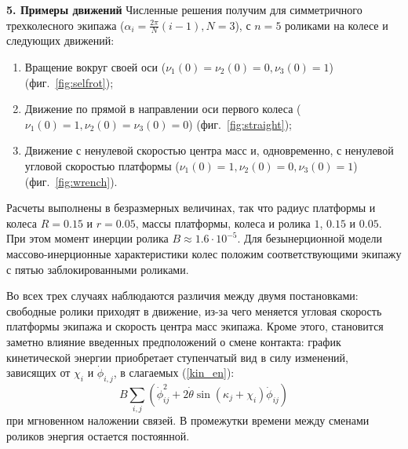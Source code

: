 
{\bf 5. Примеры движений}
Численные решения получим для симметричного трехколесного экипажа ($\alpha_i = \frac{2\pi}{N}(i - 1), N = 3$), с $n = 5$ роликами на колесе и следующих движений:
\begin{enumerate}[wide]
    \item
    \label{sol:selfrot} Вращение вокруг своей оси ($\nu_1(0) = \nu_2(0) = 0, \nu_3(0) = 1$) (фиг.~\ref{fig:selfrot});
    \item
    \label{sol:straight} Движение по прямой в направлении оси первого колеса ($\nu_1(0) = 1, \nu_2(0) = \nu_3(0) = 0$) (фиг.~\ref{fig:straight});
    \item
    \label{sol:wrench} Движение с ненулевой скоростью центра масс и, одновременно, с ненулевой угловой скоростью платформы ($\nu_1(0) = 1, \nu_2(0) = 0, \nu_3(0) = 1$) (фиг.~\ref{fig:wrench}).

\end{enumerate}


Расчеты выполнены в безразмерных величинах, так что радиус платформы и колеса $R = 0.15$ и $r = 0.05$, массы платформы, колеса и ролика $1$, $0.15$ и $0.05$. При этом момент инерции ролика $B \approx 1.6 \cdot 10^{-5}$. Для безынерционной модели массово-инерционные характеристики колес положим соответствующими экипажу с пятью заблокированными роликами.

Во всех трех случаях наблюдаются различия между двумя постановками: свободные ролики приходят в движение, из-за чего меняется угловая скорость платформы экипажа и скорость центра масс экипажа. Кроме этого, становится заметно влияние введенных предположений о смене контакта: график кинетической энергии приобретает ступенчатый вид в силу изменений, зависящих от $\chi_i$ и $\dot{\phi}_{i,j}$, в слагаемых (\ref{kin_en}): 
\begin{equation}\label{sines_in_kin_en}
    B\sum_{i,j}(\dot{\phi}_{ij}^2 + 2\dot{\theta}\sin(\kappa_j + \chi_i)\dot{\phi}_{ij})
\end{equation}
при мгновенном наложении связей. В промежутки времени между сменами роликов энергия остается постоянной. 


